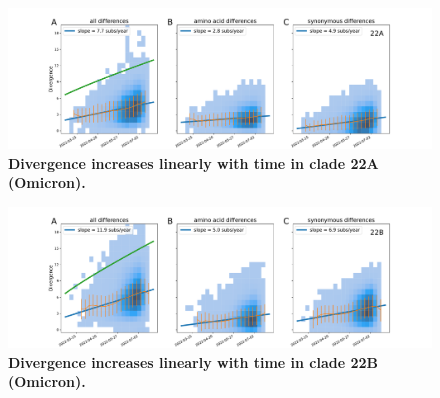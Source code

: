 \begin{figure}[h]
    \includegraphics[width=\textwidth]{figures/rtt/22A_rtt.pdf}
    \caption{{\bf Divergence increases linearly with time in clade 22A (Omicron).}
    \label{fig:22A_divergence}}
\end{figure}

\begin{figure}[h]
    \includegraphics[width=\textwidth]{figures/rtt/22B_rtt.pdf}
    \caption{{\bf Divergence increases linearly with time in clade 22B (Omicron).}
    \label{fig:22B_divergence}}
\end{figure}
